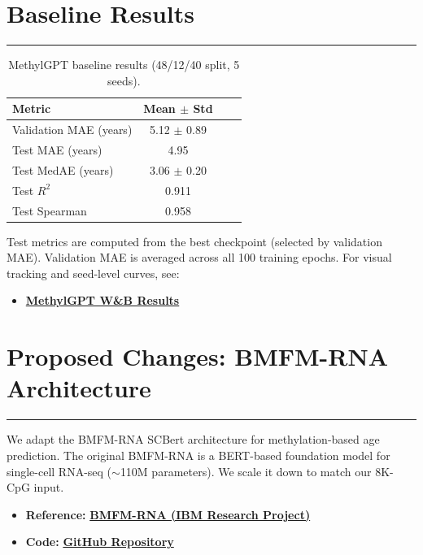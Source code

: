 \documentclass[11pt]{article}
\begin{document}
\section{Baseline Results}
\vspace{-0.3em}
\hrule
\vspace{0.8em}
\begin{table}[h]
\centering
\caption{MethylGPT baseline results (48/12/40 split, 5 seeds).}
\label{tab:results}
\begin{tabular}{lccc}
\toprule
Metric & Mean $\pm$ Std & \\
\midrule
Validation MAE (years) & 5.12 $\pm$ 0.89 & \\
Test MAE (years) & 4.95 &  \\
Test MedAE (years) & 3.06 $\pm$ 0.20 &  \\
Test $R^2$ & 0.911 & \\
Test Spearman & 0.958 &  \\
\bottomrule
\end{tabular}
\end{table}

Test metrics are computed from the best checkpoint (selected by validation MAE). Validation MAE is averaged across all 100 training epochs.
For visual tracking and seed-level curves, see:
\begin{itemize}[leftmargin=1.5em]
\item \href{https://wandb.ai/netanelazran11-hebrew-university-of-jerusalem/methylGPT_8K_ElasticNet_Features/groups/ft8k_seeds_43622436_20260107_233307/workspace?nw=nwusernetanelazran11}{\textbf{MethylGPT W\&B Results}}
\end{itemize}

\section{Proposed Changes: BMFM-RNA Architecture}
\vspace{-0.3em}
\hrule
\vspace{0.8em}
We adapt the BMFM-RNA SCBert architecture for methylation-based age prediction. The original BMFM-RNA is a BERT-based foundation model for single-cell RNA-seq ($\sim$110M parameters). We scale it down to match our 8K-CpG input.

\begin{itemize}[leftmargin=1.5em]
\item \textbf{Reference:} \href{https://research.ibm.com/projects/biomedical-foundation-models}{\textbf{BMFM-RNA (IBM Research Project)}}
\item \textbf{Code:} \href{https://github.com/netanelazran11/BiomedSciAI_ACL_Project/tree/main/methyl}{\textbf{GitHub Repository}}
\end{itemize}
\end{document}

